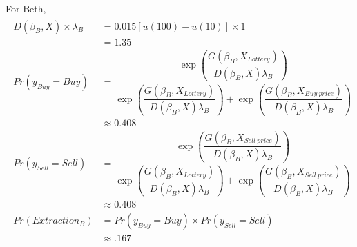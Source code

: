 \documentclass[11pt,a4paper]{article}
\newcommand\Prob{\ensuremath{\mathit{Pr}}}  %
\begin{document}
\noindent For Beth,
\begin{align}
	\label{eq:Beth}
	\begin{split}
	D(\beta_B,X) \times \lambda_B &= 0.015[u(100) - u(10)] \times 1\\
	&= 1.35 \\
	{\Prob}(y_{\mathit{Buy}} = \mathit{Buy}) &=\dfrac{\exp\!\left( \dfrac{ G(\beta_B,X_{\mathit{Lottery}}) }{ D(\beta_B,X)\lambda_B }  \right)}{ \exp\!\left( \dfrac{ G(\beta_B,X_{\mathit{Lottery}}) }{ D(\beta_B,X)\lambda_B }  \right) + \exp\!\left( \dfrac{ G(\beta_B,X_{\mathit{Buy\ price}}) }{ D(\beta_B,X)\lambda_B }  \right)  }\\[0.5ex]
	&\approx 0.408 \\
	{\Prob}(y_{\mathit{Sell}} = \mathit{Sell}) &=\dfrac{\exp\!\left( \dfrac{ G(\beta_B,X_{\mathit{Sell\ price}}) }{ D(\beta_B,X)\lambda_B }  \right)}{ \exp\!\left( \dfrac{ G(\beta_B,X_{\mathit{Lottery}}) }{ D(\beta_B,X)\lambda_B }  \right) + \exp\!\left( \dfrac{ G(\beta_B,X_{\mathit{Sell\ price}}) }{ D(\beta_B,X)\lambda_B }  \right)  }\\[0.5ex]
	&\approx 0.408 \\
	{\Prob}(\mathit{Extraction}_B) &= {\Prob}(y_{\mathit{Buy}} = \mathit{Buy}) \times {\Prob}(y_{\mathit{Sell}} = \mathit{Sell})\\
	&\approx .167
	\end{split}
\end{align}
\end{document}
